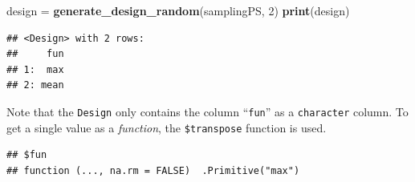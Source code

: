 \documentclass[]{scrbook}
\newenvironment{Shaded}{\begin{snugshade}}{\end{snugshade}}
\newcommand{\CommentTok}[1]{\textcolor[rgb]{0.56,0.35,0.01}{\textit{#1}}}
\newcommand{\ControlFlowTok}[1]{\textcolor[rgb]{0.13,0.29,0.53}{\textbf{#1}}}
\newcommand{\DataTypeTok}[1]{\textcolor[rgb]{0.13,0.29,0.53}{#1}}
\newcommand{\DecValTok}[1]{\textcolor[rgb]{0.00,0.00,0.81}{#1}}
\newcommand{\KeywordTok}[1]{\textcolor[rgb]{0.13,0.29,0.53}{\textbf{#1}}}
\newcommand{\NormalTok}[1]{#1}
\newcommand{\OperatorTok}[1]{\textcolor[rgb]{0.81,0.36,0.00}{\textbf{#1}}}
\newcommand{\StringTok}[1]{\textcolor[rgb]{0.31,0.60,0.02}{#1}}
\renewenvironment{Shaded} {\begin{snugshade}\small} {\end{snugshade}}
\begin{document}
\begin{Shaded}
\end{Shaded}

\begin{Shaded}
\begin{Highlighting}[]
\NormalTok{design =}\StringTok{ }\KeywordTok{generate_design_random}\NormalTok{(samplingPS, }\DecValTok{2}\NormalTok{)}
\KeywordTok{print}\NormalTok{(design)}
\end{Highlighting}
\end{Shaded}

\begin{verbatim}
## <Design> with 2 rows:
##     fun
## 1:  max
## 2: mean
\end{verbatim}

Note that the \texttt{Design} only contains the column ``\texttt{fun}'' as a \texttt{character} column.
To get a single value as a \emph{function}, the \texttt{\$transpose} function is used.

\begin{Shaded}
\end{Shaded}

\begin{verbatim}
## $fun
## function (..., na.rm = FALSE)  .Primitive("max")
\end{verbatim}
\end{document}
